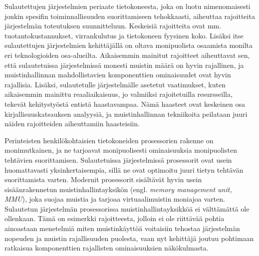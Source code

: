 Sulautettujen järjestelmien periaate tietokoneesta, joka on luotu nimenomaisesti jonkin spesifin toiminnallisuuden suorittamiseen tehokkaasti, aiheuttaa rajoitteita järjestelmän toteutuksen suunnitteluun. Keskeisiä rajoitteita ovat mm. tuotantokustannukset, virrankulutus ja tietokoneen fyysinen koko. Lisäksi itse sulautettujen järjestelmien kehittäjällä on oltava monipuolista osaamista monilta eri teknologioiden osa-alueilta.\cite{rtcfes2015book} Aikaisemmin mainitut rajoitteet aiheuttavat sen, että sulautetuissa järjestelmissä monesti muistin määrä on hyvin rajallinen, ja muistinhallinnan mahdollistavien komponenttien ominaisuudet ovat hyvin rajallisia. Lisäksi, sulautetulle järjestelmälle asetetut vaatimukset, kuten aikaisemmin mainittu reaaliaikaisuus, jo valmiiksi rajoitetuilla resursseilla, tekevät kehitystyöstä entistä haastavampaa. Nämä haasteet ovat keskeinen osa kirjallisuuskatsauksen analyysiä, ja muistinhallinnan tekniikoita peilataan juuri näiden rajoitteiden aiheuttamiin haasteisiin.

Perinteisten henkilökohtaisien tietokoneiden prosessorien rakenne on monimutkainen, ja ne tarjoavat monipuolisesti ominaisuuksia monipuolisten tehtävien suorittamisen. Sulautetuissa järjestelmissä prosessorit ovat usein huomattavasti yksinkertaisempia, sillä ne ovat optimoitu juuri tietyn tehtävän suorittamista varten. Modernit prosessorit sisältävät hyvin usein sisäänrakennetun muistinhallintayksikön (engl. \textit{memory management unit, MMU}), joka suojaa muistia ja tarjoaa virtuaalimuistin moniajoa varten. Sulautetun järjestelmän prosessorissa muistinhallintayksikköä ei välttämättä ole ollenkaan.\cite{rtcfes2015book} Tämä on esimerkki rajoitteesta, jolloin ei ole riittävää pohtia ainoastaan menetelmiä miten muistinkäyttöä voitaisiin tehostaa järjestelmän nopeuden ja muistin rajallisuuden puolesta, vaan nyt kehittäjä joutuu pohtimaan ratkaisua komponenttien rajallisten ominaisuuksien näkökulmasta.